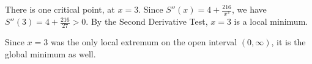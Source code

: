 \documentclass{ximera}
\begin{document}
\begin{problem}
\begin{enumerate}
\begin{explanation}
        				There is one critical point, at $x=3$. Since $S''(x) = 4 + \frac{216}{x^3}$, we have $S''(3) = 4 + \frac{216}{27} > 0$. By the
        				Second Derivative Test, $x=3$ is a local minimum.
        				
        				Since $x=3$ was the only local extremum on the open interval $(0,\infty)$, it is the global minimum as well.
			      \end{explanation}
			      
	\end{enumerate}	

\end{problem}
\end{document}
